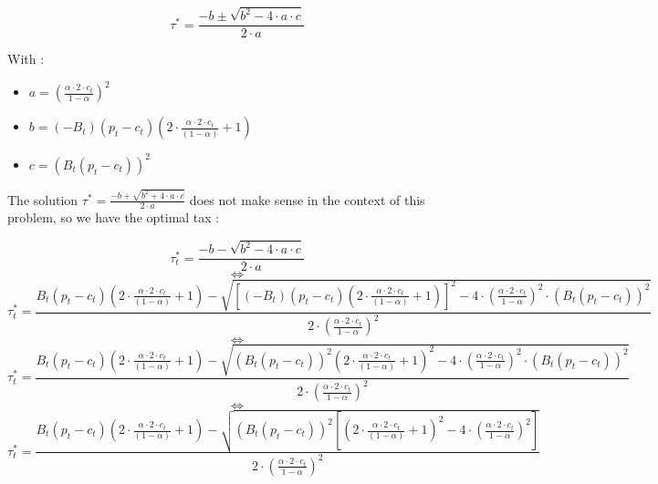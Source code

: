 \documentclass{article}
\begin{document}
$$\tau^{*}=\frac{-b\pm\sqrt{b^2-4\cdot a\cdot c}}{2\cdot a}$$

With : 

\begin{itemize}
    \item $a = \left(\frac{\alpha \cdot 2\cdot c_{t}}{1-\alpha}\right)^{2}$
    \item $b = \left(-B_{t}\right)\left(p_{t}-c_{t}\right)\left(2\cdot \frac{\alpha \cdot 2\cdot c_{t}}{(1-\alpha)}+1\right)$
    \item $c = \left(B_{t}(p_{t}-c_{t})\right)^{2}$
\end{itemize}
The solution $\tau^{*}=\frac{-b+\sqrt{b^2+4\cdot a\cdot c}}{2\cdot a}$ does not make sense in the context of this problem, so we have the optimal tax : 

\begin{equation*}
    \tau_{t}^{*}=\frac{-b-\sqrt{b^2-4\cdot a\cdot c}}{2\cdot a}
\end{equation*}
$$\iff$$
\begin{equation*}
    \tau_{t}^{*}=\frac{B_{t}\left(p_{t}-c_{t}\right)\left(2\cdot \frac{\alpha \cdot 2\cdot c_{t}}{(1-\alpha)}+1\right)-\sqrt{\left[\left(-B_{t}\right)\left(p_{t}-c_{t}\right)\left(2\cdot \frac{\alpha \cdot 2\cdot c_{t}}{(1-\alpha)}+1\right)\right]^2-4\cdot \left(\frac{\alpha \cdot 2\cdot c_{t}}{1-\alpha}\right)^{2}\cdot \left(B_{t}(p_{t}-c_{t})\right)^{2}}}{2\cdot \left(\frac{\alpha \cdot 2\cdot c_{t}}{1-\alpha}\right)^{2}}
\end{equation*}
$$\iff$$
\begin{equation*}
    \tau_{t}^{*}=\frac{B_{t}\left(p_{t}-c_{t}\right)\left(2\cdot \frac{\alpha \cdot 2\cdot c_{t}}{(1-\alpha)}+1\right)-\sqrt{\left(B_{t}\left(p_{t}-c_{t}\right)\right)^{2}\left(2\cdot \frac{\alpha \cdot 2\cdot c_{t}}{(1-\alpha)}+1\right)^2-4\cdot \left(\frac{\alpha \cdot 2\cdot c_{t}}{1-\alpha}\right)^{2}\cdot \left(B_{t}(p_{t}-c_{t})\right)^{2}}}{2\cdot \left(\frac{\alpha \cdot 2\cdot c_{t}}{1-\alpha}\right)^{2}}
\end{equation*}
$$\iff$$
\begin{equation*}
    \tau_{t}^{*}=\frac{B_{t}\left(p_{t}-c_{t}\right)\left(2\cdot \frac{\alpha \cdot 2\cdot c_{t}}{(1-\alpha)}+1\right)-\sqrt{\left(B_{t}\left(p_{t}-c_{t}\right)\right)^{2}\left[\left(2\cdot \frac{\alpha \cdot 2\cdot c_{t}}{(1-\alpha)}+1\right)^2-4\cdot \left(\frac{\alpha \cdot 2\cdot c_{t}}{1-\alpha}\right)^{2}\right]}}{2\cdot \left(\frac{\alpha \cdot 2\cdot c_{t}}{1-\alpha}\right)^{2}}
\end{equation*}
\end{document}
